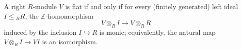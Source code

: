 A right $R$-module $V$ is flat if and only if for every (finitely generated) left ideal $I \leq {}_R R$, the $\mathbb{Z}$-homomorphism
$$V \otimes_R I \to V \otimes_R R$$
induced by the inclusion $I \hookrightarrow R$ is monic; equivalently, the natural map $V \otimes_R I \to VI$ is an isomorphism.
